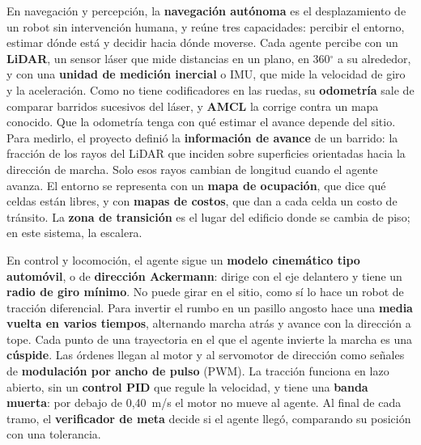 En navegación y percepción, la \textbf{navegación autónoma} es el desplazamiento
de un robot sin intervención humana, y reúne tres capacidades: percibir el
entorno, estimar dónde está y decidir hacia dónde moverse. Cada agente percibe
con un \textbf{LiDAR}, un sensor láser que mide distancias en un plano, en
360$^\circ$ a su alrededor, y con una \textbf{unidad de medición inercial} o
IMU, que mide la velocidad de giro y la aceleración. Como no tiene codificadores
en las ruedas, su \textbf{odometría} sale de comparar barridos sucesivos del
láser, y \textbf{AMCL} la corrige contra un mapa conocido. Que la odometría
tenga con qué estimar el avance depende del sitio. Para medirlo, el proyecto definió la \textbf{información de avance} de un
barrido: la fracción de los rayos del LiDAR que inciden sobre superficies
orientadas hacia la dirección de marcha. Solo esos rayos cambian de longitud
cuando el agente avanza. El entorno
se representa con un \textbf{mapa de ocupación}, que dice qué celdas están libres,
y con \textbf{mapas de costos}, que dan a cada celda un costo de tránsito. La
\textbf{zona de transición} es el lugar del edificio donde se cambia de piso; en
este sistema, la escalera.

En control y locomoción, el agente sigue un \textbf{modelo cinemático tipo
automóvil}, o de \textbf{dirección Ackermann}: dirige con el eje delantero y
tiene un \textbf{radio de giro mínimo}. No puede girar en el sitio, como sí lo
hace un robot de tracción diferencial. Para invertir el rumbo en un
pasillo angosto hace una \textbf{media vuelta en varios tiempos}, alternando
marcha atrás y avance con la dirección a tope. Cada punto de una trayectoria en
el que el agente invierte la marcha es una \textbf{cúspide}. Las órdenes llegan
al motor y al servomotor de dirección como señales de \textbf{modulación por
ancho de pulso} (PWM). La tracción funciona en lazo abierto, sin un
\textbf{control PID} que regule la velocidad, y tiene una \textbf{banda muerta}:
por debajo de 0,40~m/s el motor no mueve al agente. Al final de cada tramo, el
\textbf{verificador de meta} decide si el agente llegó, comparando su posición
con una tolerancia.

